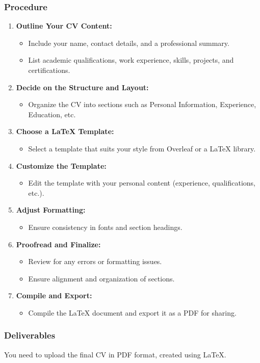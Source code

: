 \documentclass[a4paper,15pt]{article}
\begin{document}
\subsubsection*{Procedure}
\begin{enumerate}[label=\arabic*.]
    \item \textbf{Outline Your CV Content:}
    \begin{itemize}
        \item Include your name, contact details, and a professional summary.
        \item List academic qualifications, work experience, skills, projects, and certifications.
    \end{itemize}

    \item \textbf{Decide on the Structure and Layout:}
    \begin{itemize}
        \item Organize the CV into sections such as Personal Information, Experience, Education, etc.
    \end{itemize}

    \item \textbf{Choose a LaTeX Template:}
    \begin{itemize}
        \item Select a template that suits your style from Overleaf or a LaTeX library.
    \end{itemize}

    \item \textbf{Customize the Template:}
    \begin{itemize}
        \item Edit the template with your personal content (experience, qualifications, etc.).
    \end{itemize}

    \item \textbf{Adjust Formatting:}
    \begin{itemize}
        \item Ensure consistency in fonts and section headings.
    \end{itemize}

    \item \textbf{Proofread and Finalize:}
\begin{itemize}
        \item Review for any errors or formatting issues.
        \item Ensure alignment and organization of sections.
    \end{itemize}

    \item \textbf{Compile and Export:}
    \begin{itemize}
        \item Compile the LaTeX document and export it as a PDF for sharing.
    \end{itemize}
\end{enumerate}

\subsubsection*{Deliverables}
You need to upload the final CV in PDF format, created using LaTeX.
\end{document}
